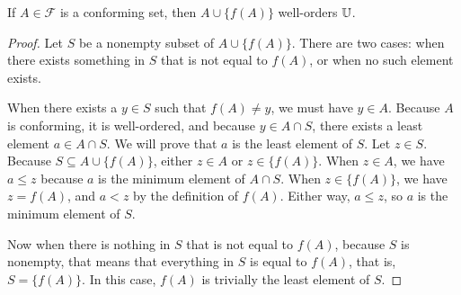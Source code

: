 \documentclass[../math.tex]{subfiles}
\begin{document}
\begin{lemma} \label{conforming-add-wo}
    If $A \in \mathcal F$ is a conforming set, then $A \cup \{f(A)\}$
    well-orders $\mathbb{U}$.
\end{lemma}
\begin{proof}
    Let $S$ be a nonempty subset of $A \cup \{f(A)\}$.  There are two cases:
    when there exists something in $S$ that is not equal to $f(A)$, or when no
    such element exists.

    When there exists a $y \in S$ such that $f(A) \neq y$, we must have $y \in
    A$.  Because $A$ is conforming, it is well-ordered, and because $y \in A
    \cap S$, there exists a least element $a \in A \cap S$.  We will prove that
    $a$ is the least element of $S$.  Let $z \in S$.  Because $S \subseteq A
    \cup \{f(A)\}$, either $z \in A$ or $z \in \{f(A)\}$.  When $z \in A$, we
    have $a \leq z$ because $a$ is the minimum element of $A \cap S$.  When $z
    \in \{f(A)\}$, we have $z = f(A)$, and $a < z$ by the definition of $f(A)$.
    Either way, $a \leq z$, so $a$ is the minimum element of $S$.

    Now when there is nothing in $S$ that is not equal to $f(A)$, because $S$ is
    nonempty, that means that everything in $S$ is equal to $f(A)$, that is, $S
    = \{f(A)\}$.  In this case, $f(A)$ is trivially the least element of $S$.
\end{proof}
\end{document}
